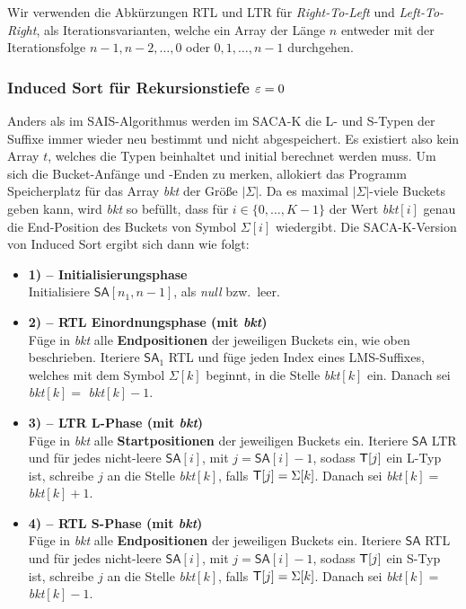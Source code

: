 Wir verwenden die Abkürzungen RTL und LTR für \textit{Right-To-Left} und \textit{Left-To-Right}, als Iterationsvarianten, welche ein Array der Länge $n$ entweder mit der Iterationsfolge $n-1, n-2, \ldots, 0$ oder $0, 1, \ldots, n - 1$ durchgehen. 

\subsubsection{ Induced Sort für Rekursionstiefe $\varepsilon = 0$}

Anders als im SAIS-Algorithmus werden im SACA-K die L- und S-Typen der Suffixe immer wieder neu bestimmt und nicht abgespeichert. Es existiert also kein Array $t$, welches die Typen beinhaltet und initial berechnet werden muss. Um sich die Bucket-Anfänge und -Enden zu merken, allokiert das Programm Speicherplatz für das Array \textit{bkt} der Größe $|\Sigma|$. Da es maximal $|\Sigma|$-viele Buckets geben kann, wird \textit{bkt} so befüllt, dass für $i \in \{0, \ldots, K-1\}$ der Wert \textit{bkt}$[i]$ genau die End-Position des Buckets von Symbol $\Sigma[i]$ wiedergibt. Die SACA-K-Version von Induced Sort ergibt sich dann wie folgt:
\begin{itemize}
\item \textbf{1) -- Initialisierungsphase} \\
Initialisiere $\mathsf{SA}[n_1, n-1]$, als \textit{null} bzw.\ leer.

\item \textbf{2) -- RTL Einordnungsphase (mit \textit{bkt})} \\
Füge in \textit{bkt}  alle \textbf{Endpositionen} der jeweiligen Buckets ein, wie oben beschrieben. Iteriere $\mathsf{SA}_1$ RTL und füge jeden Index eines LMS-Suffixes, welches mit dem Symbol $\Sigma[k]$ beginnt, in die Stelle \textit{bkt}$[k]$ ein. Danach sei \textit{bkt}$[k] = $ \textit{bkt}$[k]-1$.

\item \textbf{3) -- LTR L-Phase (mit \textit{bkt})} \\
Füge in \textit{bkt}  alle \textbf{Startpositionen} der jeweiligen Buckets ein. Iteriere $\mathsf{SA}$ LTR und für jedes nicht-leere $\mathsf{SA}[i]$, mit $j = \mathsf{SA}[i]-1$, sodass $\inputtext[j]$ ein L-Typ ist, schreibe $j$ an die Stelle \textit{bkt}$[k]$, falls $\inputtext[j] = \Sigma[k]$. Danach sei \textit{bkt}$[k] = $ \textit{bkt}$[k]+1$.

\item \textbf{4) -- RTL S-Phase (mit \textit{bkt})} \\
Füge in \textit{bkt}  alle \textbf{Endpositionen} der jeweiligen Buckets ein. Iteriere $\mathsf{SA}$ RTL und für jedes nicht-leere $\mathsf{SA}[i]$, mit $j = \mathsf{SA}[i]-1$, sodass $\inputtext[j]$ ein S-Typ ist, schreibe $j$ an die Stelle \textit{bkt}$[k]$, falls $\inputtext[j] = \Sigma[k]$. Danach sei \textit{bkt}$[k] = $ \textit{bkt}$[k]-1$.
\end{itemize}

